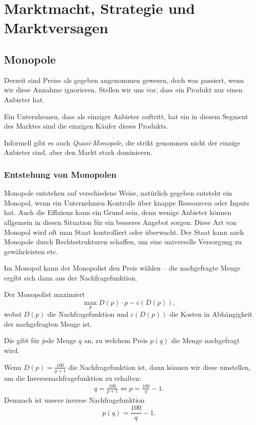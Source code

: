 \chapter{Marktmacht, Strategie und Marktversagen}


\section{Monopole}

Derzeit sind Preise als gegeben angenommen gewesen, doch was passiert, wenn wir diese Annahme ignorieren.
Stellen wir uns vor, dass ein Produkt nur einen Anbieter hat.


\begin{definition}[Monopol]
	Ein Unternhemen, dass als einziger Anbieter auftritt, hat ein  in diesem Segment des Marktes
	 sind die einzigen Käufer dieses Produkts.
\end{definition}

Informell gibt es auch \emph{Quasi-Monopole}, die strikt genommen nicht der einzige Anbieter sind,
aber den Markt stark dominieren.

\subsection{Entstehung von Monopolen}

Monopole entstehen auf verschiedene Weise, natürlich gegeben entsteht ein Monopol, wenn ein Unternehmen Kontrolle über knappe Ressourcen oder Inputs hat.
Auch die Effizienz kann ein Grund sein, denn wenige Anbieter können allgemein in diesen Situation für ein besseres Angebot sorgen.
Diese Art von Monopol wird oft man Staat kontrolliert oder überwacht.
Der Staat kann auch Monopole durch Rechtsstrukturen schaffen, um eine universelle Versorgung zu gewährleisten etc.


Im Monopol kann der Monopolist den Preis wählen – die nachgefragte
Menge ergibt sich dann aus der Nachfragefunktion.
\begin{construction}
	Der Monopolist maximiert
	\[
		\max_p D(p) \cdot p - c(D(p))
		,\]
	wobei $D(p)$ die Nachfragefunktion und $c(D(p))$ die Kosten in Abhängigkeit der nachgefragten Menge ist.
\end{construction}

\begin{definition}
    Die  gibt für jede Menge $q$ an, zu welchem Preis $p(q)$ die Menge nachgefragt wird.
\end{definition}
\begin{example}
Wenn $D(p) = \frac{100}{p+1}$ die Nachfragefunktion ist, dann können wir diese umstellen, um die Inversenachfragefunktion zu erhalten:
\begin{align*}
    q= \frac{100}{p+1} \iff p = \frac{100}{q} - 1
.\end{align*}
Demnach ist unsere inverse Nachfragefunktion
\[
p(q) = \frac{100}{q}-1
.\] 
\end{example}

